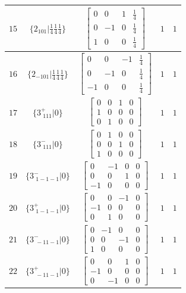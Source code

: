 \documentclass[fleqn,8pt]{jsarticle}
\begin{document}
\begin{longtable}{ccccc}
$ 15 $ & $ \{2{}_{101}|\frac{1}{4} \frac{1}{4} \frac{1}{4}\} $ & $ \begin{bmatrix} 0 & 0 & 1 & \frac{1}{4} \\ 0 & -1 & 0 & \frac{1}{4} \\ 1 & 0 & 0 & \frac{1}{4} \end{bmatrix} $ & $ 1 $ & $ 1 $ \\ \hline
$ 16 $ & $ \{2{}_{-101}|\frac{1}{4} \frac{1}{4} \frac{1}{4}\} $ & $ \begin{bmatrix} 0 & 0 & -1 & \frac{1}{4} \\ 0 & -1 & 0 & \frac{1}{4} \\ -1 & 0 & 0 & \frac{1}{4} \end{bmatrix} $ & $ 1 $ & $ 1 $ \\ \hline
$ 17 $ & $ \{3^{+}_{\,\,111}|0\} $ & $ \begin{bmatrix} 0 & 0 & 1 & 0 \\ 1 & 0 & 0 & 0 \\ 0 & 1 & 0 & 0 \end{bmatrix} $ & $ 1 $ & $ 1 $ \\ \hline
$ 18 $ & $ \{3^{-}_{\,\,111}|0\} $ & $ \begin{bmatrix} 0 & 1 & 0 & 0 \\ 0 & 0 & 1 & 0 \\ 1 & 0 & 0 & 0 \end{bmatrix} $ & $ 1 $ & $ 1 $ \\ \hline
$ 19 $ & $ \{3^{-}_{\,\,1-1-1}|0\} $ & $ \begin{bmatrix} 0 & -1 & 0 & 0 \\ 0 & 0 & 1 & 0 \\ -1 & 0 & 0 & 0 \end{bmatrix} $ & $ 1 $ & $ 1 $ \\ \hline
$ 20 $ & $ \{3^{+}_{\,\,1-1-1}|0\} $ & $ \begin{bmatrix} 0 & 0 & -1 & 0 \\ -1 & 0 & 0 & 0 \\ 0 & 1 & 0 & 0 \end{bmatrix} $ & $ 1 $ & $ 1 $ \\ \hline
$ 21 $ & $ \{3^{-}_{\,\,-11-1}|0\} $ & $ \begin{bmatrix} 0 & -1 & 0 & 0 \\ 0 & 0 & -1 & 0 \\ 1 & 0 & 0 & 0 \end{bmatrix} $ & $ 1 $ & $ 1 $ \\ \hline
$ 22 $ & $ \{3^{+}_{\,\,-11-1}|0\} $ & $ \begin{bmatrix} 0 & 0 & 1 & 0 \\ -1 & 0 & 0 & 0 \\ 0 & -1 & 0 & 0 \end{bmatrix} $ & $ 1 $ & $ 1 $ \\ \hline

\end{longtable}
\end{document}

